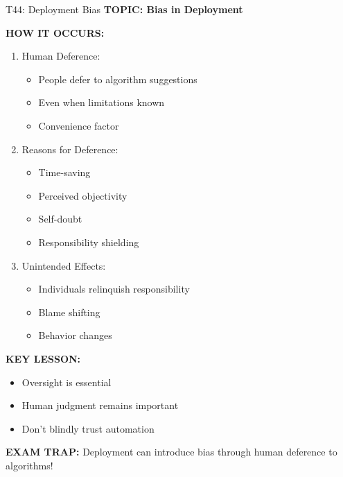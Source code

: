 \documentclass[8pt]{beamer}
\begin{document}
	\begin{frame}{T44: Deployment Bias}
		\fontsize{6.5}{7.5}\selectfont
		\textbf{TOPIC: Bias in Deployment}
		
		\vspace{0.1cm}
		\textbf{HOW IT OCCURS:}
		\begin{enumerate}
			\item \textcolor{myblue}{Human Deference:}
			\begin{itemize}
				\item People defer to algorithm suggestions
				\item Even when limitations known
				\item Convenience factor
			\end{itemize}
			\item \textcolor{myblue}{Reasons for Deference:}
			\begin{itemize}
				\item Time-saving
				\item Perceived objectivity
				\item Self-doubt
				\item Responsibility shielding
			\end{itemize}
			\item \textcolor{myblue}{Unintended Effects:}
			\begin{itemize}
				\item Individuals relinquish responsibility
				\item Blame shifting
				\item Behavior changes
			\end{itemize}
		\end{enumerate}
		
		\vspace{0.1cm}
		\textbf{KEY LESSON:}
		\begin{itemize}
			\item Oversight is essential
			\item Human judgment remains important
			\item Don't blindly trust automation
		\end{itemize}
		
		\textcolor{myred}{\textbf{EXAM TRAP:}} Deployment can introduce \textcolor{myblue}{bias through human deference} to algorithms!
	\end{frame}
	
\end{document}

